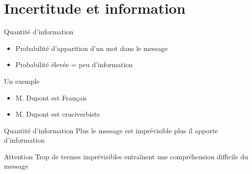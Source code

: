 \section{Incertitude et information}

\begin{frame}
	\begin{block}{Quantité d'information}
		\begin{itemize}
			\item{Probabilité d'apparition d'un mot dans le message}
			\item{Probabilité élevée = peu d'information}
		\end{itemize}
	\end{block} \pause
	
	\begin{exampleblock}{Un exemple}
		\begin{itemize}
			\item{M. Dupont est Français} \pause
			\item{M. Dupont est cruciverbiste}
		\end{itemize}
	\end{exampleblock}
    \pause
	\begin{block}{Quantité d'information}
		Plus le message est imprévisible plus il apporte d'information
	\end{block} \pause
	
	\begin{alertblock}{Attention}
		Trop de termes imprévisibles entraînent une compréhension difficile du message
	\end{alertblock}
\end{frame}
